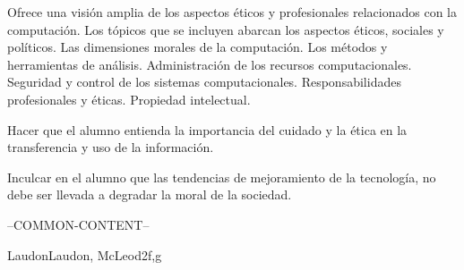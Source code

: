 \begin{syllabus}


\begin{justification}
Ofrece una visión amplia de los aspectos éticos y profesionales relacionados con la computación. Los tópicos que se incluyen abarcan los aspectos éticos, sociales y políticos. Las dimensiones morales de la computación. Los métodos y herramientas de análisis. Administración de los recursos computacionales. Seguridad y control de los sistemas computacionales. Responsabilidades profesionales y éticas. Propiedad intelectual.
\end{justification}

\begin{goals}
\item Hacer que el alumno entienda la importancia del cuidado y la ética en la transferencia y uso de la información.
\item Inculcar en el alumno que las tendencias de mejoramiento de la tecnología, no debe ser llevada a degradar la moral de la sociedad.
\end{goals}

--COMMON-CONTENT--

\begin{unit}{\SPHistory}{}{LaudonLaudon, McLeod}{2}{f,g}
    \begin{topics}
    	\item \SPHistoryTopicPrehistory
        \item \SPHistoryTopicHistory
        \item \SPHistoryTopicPioneers
        \item \SPHistoryTopicHistoryOf
    \end{topics}
    \begin{learningoutcomes}%
        \item \SPHistoryLOIdentifySignificant [\Familiarity]
        \item \SPHistoryLOIdentifyTheSeveral [\Familiarity]
        \item \SPHistoryLODiscussTheForLanguage [\Familiarity]
        \item \SPHistoryLOCompareDaily [\Familiarity]
    \end{learningoutcomes}
\end{unit}


\end{syllabus}
